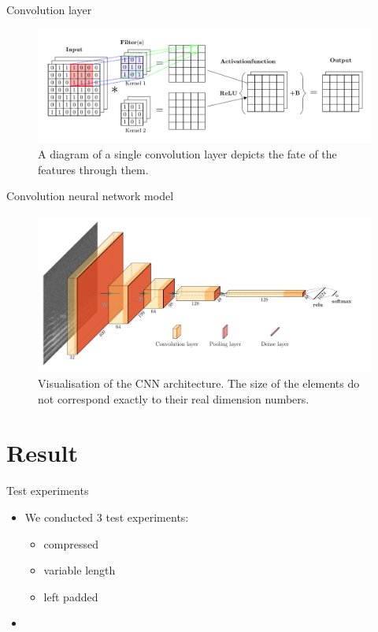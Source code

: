\documentclass[10pt]{beamer}
\begin{document}
\begin{frame}{Convolution layer}
\begin{figure}[H]
\centering
  \includegraphics[width=1\textwidth]{image/cnn_schema.pdf}
  \caption{A diagram of a single convolution layer depicts the fate of the features through them.}
  \label{fig:cnn_schema}
\end{figure}
\end{frame}

\begin{frame}{Convolution neural network model}
\begin{figure}[H]
\centering
  \includegraphics[width=1\textwidth]{image/ml_model_cnn.pdf}\hfill
  \caption{Visualisation of the CNN architecture. The size of the elements do not correspond exactly to their real dimension numbers.}
  \label{fig:ml_model_cnn}
\end{figure}
\end{frame}


\section{Result}
\begin{frame}{Test experiments}
\begin{itemize}
\item We conducted 3 test experiments:
\begin{itemize}
\item compressed
\item variable length
\item left padded
\end{itemize}
\item 
\end{itemize}
\end{frame}
\end{document}

